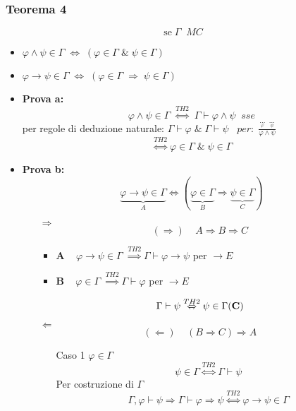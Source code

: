 \documentclass{article}
\theoremstyle{break}
\theoremstyle{break}
\theoremstyle{break}
\theoremstyle{break}
\begin{document}
\subsubsection{Teorema 4}
\[
\text{se}\;\Gamma\;\;MC
\] 
\begin{itemize}
  \item \( \varphi \wedge \psi \in \Gamma\; \Leftrightarrow\; (\varphi \in \Gamma\;\&\; \psi \in\Gamma)\) 
  \item \( \varphi \to \psi \in \Gamma\; \Leftrightarrow\; (\varphi \in  \Gamma \;\Rightarrow\; \psi \in \Gamma) \) 
\end{itemize}
\begin{itemize}
  \item 
    \textbf{Prova a:}
    \[
      \varphi \wedge \psi \in \Gamma \; \stackrel{TH2}{\Leftrightarrow}\; \Gamma \vdash \varphi \wedge \psi\;\;sse 
    \] 
    per regole di deduzione naturale: \( \Gamma \vdash \varphi \;\&\; \Gamma \vdash \psi\;\;\; per:\; \frac{\underset{\varphi}{\ldots}\;\;\underset{\psi}{\ldots}}{\varphi \wedge \psi} \) 
    \[
      \stackrel{TH2}{\Leftrightarrow} \varphi \in \Gamma\;\&\; \psi \in \Gamma
    \] 
  \item \textbf{Prova b:}
    \[
      \underbrace{\varphi \to \psi \in \Gamma}_{A} \Leftrightarrow (\underbrace{\varphi \in  \Gamma}_{B} \Rightarrow \underbrace{\psi \in \Gamma}_{C})
    \] 
    \begin{enumerate}
      \item [\( \Rightarrow\)] 
        \[
          (\Rightarrow)\;\;\;\;        A \Rightarrow B \Rightarrow C
        \] 
        \begin{itemize}
          \item \textbf{A} \( \;\;\; \varphi \to  \psi \in \Gamma\; \stackrel{TH2}{\Rightarrow} \Gamma \vdash \varphi \to \psi \) per \( \to E \) 
          \item \textbf{B} \( \;\;\;\varphi \in \Gamma\; \stackrel{TH2}{\Rightarrow} \Gamma \vdash \varphi \) per \( \to E \) 
        \end{itemize}
        \[
          \Gamma \vdash \psi \stackrel{TH2}{\Leftrightarrow} \psi \in \Gamma (\text{\textbf{C}})
        \] 
      \item [\( \Leftarrow \) ]
        \[
          (\Leftarrow)\;\;\;\; (B \Rightarrow C) \Rightarrow A
        \] 
        \begin{enumerate}
          \item [Caso 1] \( \varphi \in \Gamma \) 
                    \[
          \psi \in \Gamma \stackrel{TH2}{\Leftrightarrow} \Gamma \vdash \psi
        \] 
        Per costruzione di \( \Gamma \) 
        \[
          \Gamma,\varphi \vdash \psi \Rightarrow \Gamma \vdash \varphi \Rightarrow \psi \stackrel{TH2}{\Leftrightarrow} \varphi \to \psi \in \Gamma
        \] 


\end{enumerate}
\end{enumerate}
\end{itemize}
\end{document}
